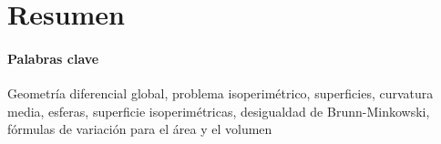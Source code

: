 \section{Resumen}


\paragraph{Palabras clave} Geometría diferencial global, problema isoperimétrico, superficies, curvatura media, esferas, superficie isoperimétricas, desigualdad de Brunn-Minkowski, fórmulas de variación para el área y el volumen